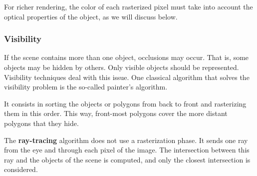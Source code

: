 For  richer  rendering,  the  color  of  each rasterized pixel must take into account the optical properties of the object, as we will discuss below. 

\subsubsection{Visibility}

If the scene contains more than one object, occlusions may occur. That is, some objects may be hidden by others. Only visible objects should be represented. Visibility techniques deal with this issue. One classical algorithm that solves the visibility problem is the so-called painter’s algorithm.

It consists in  sorting  the  objects  or  polygons  from  back  to  front  and  rasterizing  them  in  this  order.  This  way,  front-most polygons cover the more distant polygons that they hide. 

\begin{figure}[H]
\centering
{}
\end{figure}

The \textbf{ray-tracing} algorithm does not use a rasterization phase. It sends one ray from the eye and through each pixel of the image. The intersection between this ray and the objects of the scene is computed, and only the closest intersection is considered.

\begin{figure}[H]
\centering
{}
\end{figure}

